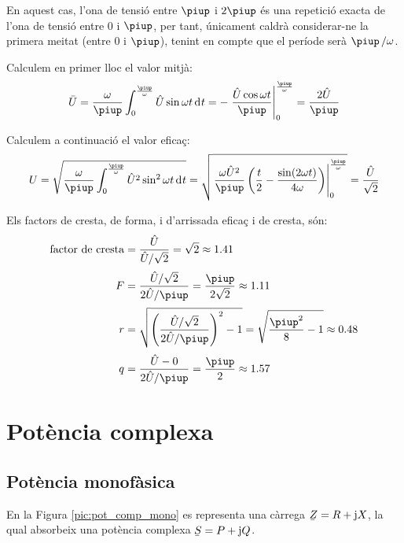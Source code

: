 \begin{exemple}
    En aquest cas, l'ona de tensió entre $\piup$ i $2\piup$ és una repetició
    exacta de l'ona de tensió entre 0 i $\piup$, per tant, únicament
    caldrà considerar-ne la primera meitat (entre 0 i $\piup$), tenint en
    compte que el període serà $\piup\,/\omega$.

     Calculem en primer lloc el valor mitjà:
    \[
    \bar{U} = \frac{\omega}{\piup} \int_0^\frac{\piup}{\omega} \hat{U}
    \sin\omega t \diff t  = - \left. \frac{\hat{U} \cos\omega t}{\piup}
    \right|_0^\frac{\piup}{\omega} = \frac{2 \hat{U}}{\piup}
    \]

    Calculem a continuació el valor eficaç:
    \[
    U = \sqrt{\frac{\omega}{\piup} \int_0^\frac{\piup}{\omega} \hat{U}^2
    \sin^2\omega t \diff t } =   \sqrt{\left.\frac{\omega
    \hat{U}^2}{\piup}\left( \frac{t}{2} - \frac{\sin (2\omega t)}{4\omega}
    \right)\right|_0^\frac{\piup}{\omega}}  = \frac{\hat{U}}{\sqrt{2}}
    \]

    Els factors de cresta, de forma, i d'arrissada eficaç i de cresta, són:
    \begin{align*}
        \text{factor de cresta} &= \frac{\hat{U}}{\hat{U}/\sqrt{2}} = \sqrt{2} \approx\num{1,41} \\[0.5ex]
        F &= \frac{\hat{U}/\sqrt{2}}{2 \hat{U}/\piup} =\frac{\piup}{2\sqrt{2}} \approx
        \num{1,11} \\[0.5ex]
    r &= \sqrt{\left(\frac{\hat{U}/\sqrt{2}}{2 \hat{U}/\piup}\right)^2-1}
    = \sqrt{\frac{\piup^2}{8}-1} \approx \num{0,48}\\[0.5ex]
    q &=  \frac{\hat{U} - 0}{2 \hat{U}/\piup} = \frac{\piup}{2} \approx \num{1,57}
    \end{align*}
\end{exemple}

\section{Potència complexa}\label{sec:pot_complex} 

\subsection{Potència monofàsica} 

En la Figura \vref{pic:pot_comp_mono} es representa una càrrega $\cmplx{Z}=R+\ju X$, la
qual absorbeix una potència complexa $\cmplx{S} = P + \ju Q$.
\begin{center}
    
    \label{pic:pot_comp_mono}
\end{center}

